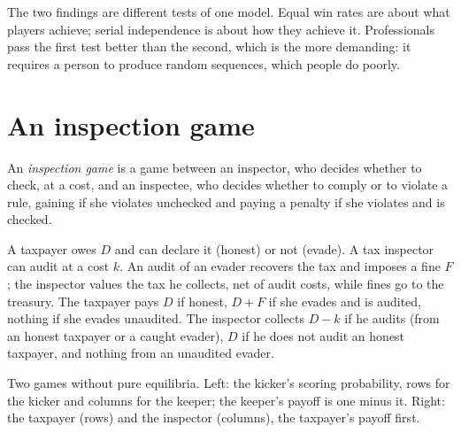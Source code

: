 The two findings are different tests of one model. Equal win rates are about what players achieve; serial
independence is about how they achieve it. Professionals pass the first test better than the second,
which is the more demanding: it requires a person to produce random sequences, which people do poorly.

\section{An inspection game}\label{sec:b2:mixed-strategies:inspection}

\begin{definition}\label{def:b2:mixed-strategies:inspection-game}
An \emph{inspection game} is a game between an inspector, who decides whether to
check, at a cost, and an inspectee, who decides whether to comply or to violate a rule, gaining if she
violates unchecked and paying a penalty if she violates and is checked.
\end{definition}

A taxpayer owes $D$ and can declare it (honest) or not (evade). A tax inspector can audit at a cost $k$. An audit
of an evader recovers the tax and imposes a fine $F$; the inspector values the tax he collects, net of audit
costs, while fines go to the treasury. The taxpayer pays $D$ if honest, $D + F$ if she evades and is audited,
nothing if she evades unaudited. The inspector collects $D - k$ if he audits (from an honest taxpayer or a
caught evader), $D$ if he does not audit an honest taxpayer, and nothing from an unaudited evader.

\begin{omfigure}

{\small Two games without pure equilibria. Left: the kicker's scoring probability, rows for the kicker and
columns for the keeper; the keeper's payoff is one minus it. Right: the taxpayer (rows) and the inspector
(columns), the taxpayer's payoff first.}
\end{omfigure}


